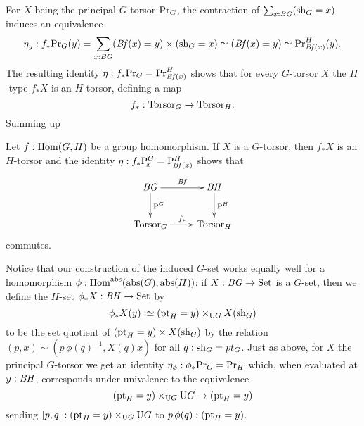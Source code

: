 For $X$ being the principal $G$-torsor  $\mathrm{Pr}_{{G}}$, the contraction of $\sum_{x:\mathit{B}\mathit{G}}(\mathrm{sh}_G=x)$ induces an equivalence
$$\eta_y:f_*\princ G(y)=\sum_{x:\BG}(\Bf(x)=y)\times(\sh_G=x)\simeq (\Bf(x)=y)\oldequiv\princ{\Bf(x)}^H(y).$$  The resulting identity $\bar\eta:f_*\mathrm{Pr}_{{G}}=\mathrm{Pr}_{{\mathit{B}\mathit{f}(x)}}^H$ shows that for every $G$-torsor $X$ the $H$-type $f_*X$ is an $H$-torsor, defining a map 
$$f_*:\mathrm{Torsor}_G\to\mathrm{Torsor}_H.$$
Summing up
\begin{lemma}
  \label{lem:inducedtorsor}
   Let $f:\Hom(G,H)$ be a group homomorphism.  
If $X$ is a $G$-torsor, then $f_*X$ is an $H$-torsor and the identity 
$\bar{\eta}:f_*\mathrm{P}_{\!x}^G=\mathrm{P}_{\!\mathit{B}\mathit{f}(x)}^H$
shows that  
$$\xymatrix{\BG\ar[r]^{\Bf}\ar[d]^{\pathsp{}^G}&\BH\ar[d]^{\pathsp{}^H}\\
\typetorsor_G\ar[r]^{f_*}&\typetorsor_H}$$ 
commutes.
\end{lemma}
\begin{remark}
  \label{rem:inducedGsetfromabstracthomomorphisms}
  Notice that our construction of the induced $G$-set works equally well for a homomorphism $\phi:\Hom^\abstr(\abstr(G),\abstr(H))$:
  if $X:\mathit{B}\mathit{G}\to\mathrm{Set}$ is a $G$-set, then we define the $H$-set $\phi_*X:\mathit{B}\mathit{H}\to\mathrm{Set}$ by 
  $$\phi_*X(y)\defequi(\pt_H=y)\times_{\USym G}X(\sh_G)$$
  to be the set quotient of $(\mathrm{pt}_H=y)\times X(\mathrm{sh}_G)$ by the relation $(p,x)\sim(p\, \phi(q)^{-1},X(q)x)$ for all $q:\mathrm{sh}_G=pt_G$.
  Just as above, for $X$ the principal $G$-torsor we get an identity  $\eta_\phi:\phi_*\mathrm{Pr}_{{G}}=\mathrm{Pr}_{{H}}$ which, when evaluated at $y:\mathit{B}\mathit{H}$, corresponds under univalence to the equivalence 
$$(\mathrm{pt}_H=y)\times_{\mathrm{U} G}\mathrm{U} G\to (\mathrm{pt}_H=y)$$ 
sending $[p,q]:(\mathrm{pt}_H=y)\times_{\mathrm{U} G}\mathrm{U} G$ to $p\,\phi(q):(\mathrm{pt}_H=y)$.
\end{remark}


